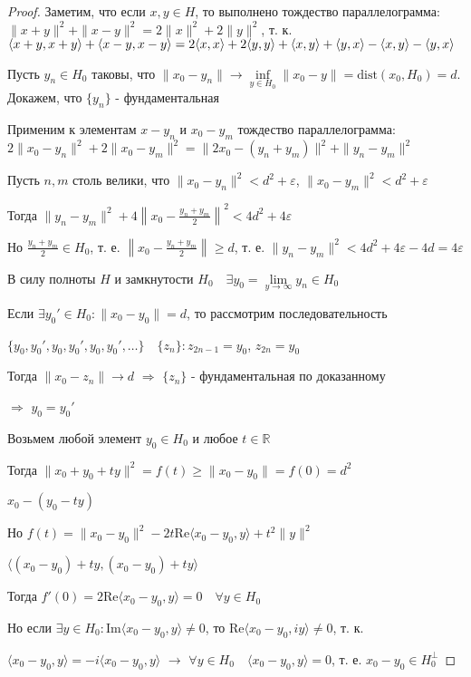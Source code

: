 \documentclass[a4paper,12pt]{report}
\newcommand*{\hm}[1]{#1\nobreak\discretionary{}%
            {\hbox{$\mathsurround=0pt #1$}}{}}
\begin{document}
\begin{proof}
Заметим, что если $x,y\in H$, то выполнено тождество параллелограмма: $\|x+y\|^2+\|x-y\|^2=2\|x\|^2+2\|y\|^2$, т. к. $\langle x+y,x+y\rangle+\langle x\hm-y,x-y\rangle=2\langle x,x\rangle+2\langle y,y\rangle+\langle x,y\rangle+\langle y,x\rangle-\langle x,y\rangle-\langle y,x\rangle$

Пусть $y_n\in H_0$ таковы, что $\|x_0-y_n\|\to\inf\limits_{y\in H_0}\|x_0-y\|=\mathrm{dist}(x_0,H_0)=d$. Докажем, что $\{y_n\}$ - фундаментальная

Применим к элементам $x-y_n$ и $x_0-y_m$ тождество параллелограмма: $2\|x_0-y_n\|^2+2\|x_0-y_m\|^2=\|2x_0-(y_n+y_m)\|^2+\|y_n-y_m\|^2$

Пусть $n,m$ столь велики, что $\|x_0-y_n\|^2<d^2+\varepsilon$, $\|x_0-y_m\|^2<d^2+\varepsilon$

Тогда $\|y_n-y_m\|^2+4\left\|x_0-\frac{y_n+y_m}{2}\right\|^2<4d^2+4\varepsilon$

Но $\frac{y_n+y_m}{2}\in H_0$, т. е. $\left\|x_0-\frac{y_n+y_m}2\right\|\ge d$, т. е. $\|y_n-y_m\|^2<4d^2+4\varepsilon-4d=4\varepsilon$

В силу полноты $H$ и замкнутости $H_0\quad\exists y_0=\lim\limits_{y\to\infty}y_n\in H_0$

Если $\exists y_0'\in H_0\colon\|x_0-y_0\|=d$, то рассмотрим последовательность 

$\{y_0,y_0',y_0,y_0',y_0,y_0',\ldots\}\quad \{z_n\}\colon z_{2n-1}=y_0$, $z_{2n}=y_0$

Тогда $\|x_0-z_n\|\to d$ $\Rightarrow$ $\{z_n\}$ - фундаментальная по доказанному 

\noindent $\Rightarrow$ $y_0=y_0'$

Возьмем любой элемент $y_0\in H_0$ и любое $t\in\mathbb R$

Тогда $\|x_0+y_0+ty\|^2=f(t)\ge\|x_0-y_0\|=f(0)=d^2$

$x_0-(y_0-ty)$

Но $f(t)=\|x_0-y_0\|^2-2t\mathrm{Re}\langle x_0-y_0,y\rangle+t^2\|y\|^2$

$\langle(x_0-y_0)+ty,(x_0-y_0)+ty\rangle$

Тогда $f'(0)=2\mathrm{Re}\langle x_0-y_0,y\rangle=0\quad\forall y\in H_0$

Но если $\exists y\in H_0\colon\mathrm{Im}\langle x_0-y_0,y\rangle\ne0$, то $\mathrm{Re}\langle x_0-y_0,iy\rangle\ne0$, т. к. 

\noindent$\langle x_0-y_0,y\rangle=-i\langle x_0-y_0,y\rangle$ $\rightarrow$ $\forall y\in H_0\quad \langle x_0-y_0,y\rangle=0$, т. е. $x_0-y_0\in H_0^\perp$
\end{proof}
 
\end{document}
